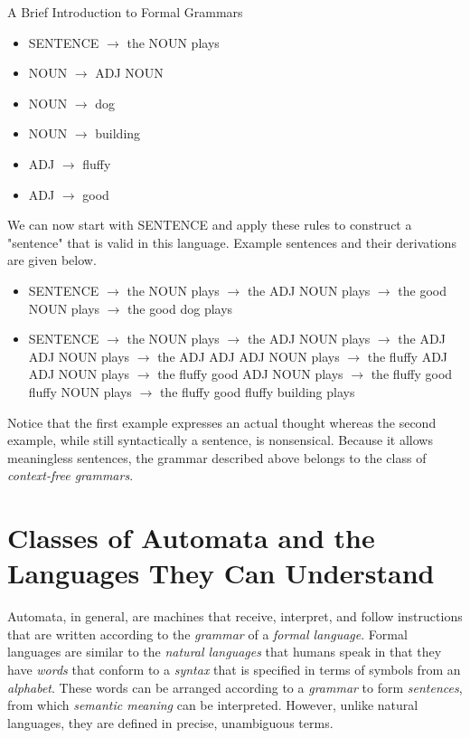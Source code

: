 \begin{bluebox}{A Brief Introduction to Formal Grammars}
    \vspace{4mm}
    \begin{itemize}
        \item SENTENCE $\rightarrow$ the NOUN plays
        \item NOUN $\rightarrow$ ADJ NOUN
        \item NOUN $\rightarrow$ dog
        \item NOUN $\rightarrow$ building
        \item ADJ $\rightarrow$ fluffy
        \item ADJ $\rightarrow$ good
    \end{itemize}
    \vspace{4mm}
        
    We can now start with SENTENCE and apply these rules to construct a "sentence" that is valid in this language. Example sentences and their derivations are given below.

    \vspace{4mm}
    \begin{itemize}
        \item SENTENCE $\rightarrow$ the NOUN plays $\rightarrow$ the ADJ NOUN plays $\rightarrow$ the good NOUN plays $\rightarrow$ the good dog plays
        \item SENTENCE $\rightarrow$ the NOUN plays $\rightarrow$ the ADJ NOUN plays $\rightarrow$ the ADJ ADJ NOUN plays $\rightarrow$ the ADJ ADJ ADJ NOUN plays $\rightarrow$ the fluffy ADJ ADJ NOUN plays $\rightarrow$ the fluffy good ADJ NOUN plays $\rightarrow$ the fluffy good fluffy NOUN plays $\rightarrow$ the fluffy good fluffy building plays
    \end{itemize}
    \vspace{4mm}
        
    Notice that the first example expresses an actual thought whereas the second example, while still syntactically a sentence, is nonsensical. Because it allows meaningless sentences, the grammar described above belongs to the class of \textit{context-free grammars}.

\end{bluebox}

\section{Classes of Automata and the Languages They Can Understand}

Automata, in general, are machines that receive, interpret, and follow instructions that are written according to the \textit{grammar} of a \textit{formal language}. Formal languages are similar to the \textit{natural languages} that humans speak in that they have \textit{words} that conform to a \textit{syntax} that is specified in terms of symbols from an \textit{alphabet}. These words can be arranged according to a \textit{grammar} to form \textit{sentences}, from which \textit{semantic meaning} can be interpreted. However, unlike natural languages, they are defined in precise, unambiguous terms.

